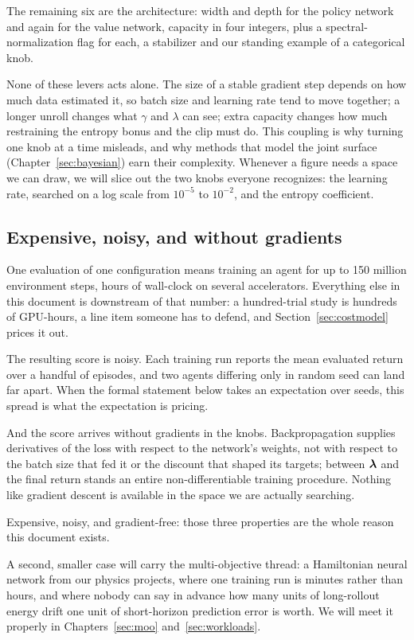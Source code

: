 The remaining six are the architecture: width and depth for the policy
network and again for the value network, capacity in four integers,
plus a spectral-normalization flag for each, a stabilizer and our
standing example of a categorical knob.

None of these levers acts alone. The size of a stable gradient step
depends on how much data estimated it, so batch size and learning rate
tend to move together; a longer unroll changes what $\gamma$ and
$\lambda$ can see; extra capacity changes how much restraining the
entropy bonus and the clip must do. This coupling is why turning one
knob at a time misleads, and why methods that model the joint surface
(Chapter~\ref{sec:bayesian}) earn their complexity. Whenever a figure
needs a space we can draw, we will slice out the two knobs everyone
recognizes: the learning rate, searched on a log scale from $10^{-5}$
to $10^{-2}$, and the entropy coefficient.

\subsection{Expensive, noisy, and without gradients}

One evaluation of one configuration means training an agent for up to
150 million environment steps, hours of wall-clock on several
accelerators. Everything else in this document is downstream of that
number: a hundred-trial study is hundreds of GPU-hours, a line item
someone has to defend, and Section~\ref{sec:costmodel} prices it out.

The resulting score is noisy. Each training run reports the mean
evaluated return over a handful of episodes, and two agents differing only in
random seed can land far apart. When the formal statement below takes
an expectation over seeds, this spread is what the expectation is
pricing.

And the score arrives without gradients in the knobs. Backpropagation
supplies derivatives of the loss with respect to the network's
weights, not with respect to the batch size that fed it or the
discount that shaped its targets; between $\bm{\lambda}$ and the final
return stands an entire non-differentiable training procedure. Nothing
like gradient descent is available in the space we are actually
searching.

Expensive, noisy, and gradient-free: those three properties are the
whole reason this document exists.

A second, smaller case will carry the multi-objective thread: a Hamiltonian
neural network from our physics projects, where one training run is minutes
rather than hours, and where nobody can say in advance how many units of long-rollout
energy drift one unit of short-horizon prediction error is worth. We will
meet it properly in Chapters~\ref{sec:moo} and~\ref{sec:workloads}.

